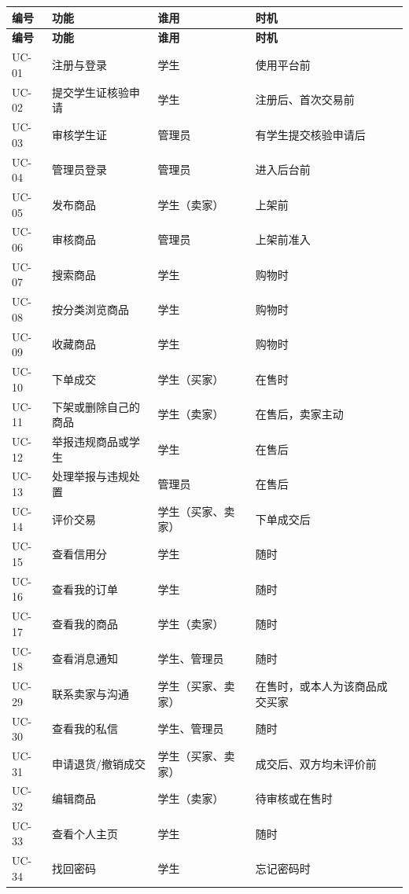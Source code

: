 \documentclass[12pt,a4paper]{ctexart}
\begin{document}
{\scriptsize
\begin{longtable}{|p{1.62cm}|p{4.40cm}|p{4.08cm}|p{5.89cm}|}
\hline
\textbf{编号} & \textbf{功能} & \textbf{谁用} & \textbf{时机} \\
\hline
\endfirsthead
\hline
\textbf{编号} & \textbf{功能} & \textbf{谁用} & \textbf{时机} \\
\hline
\endhead
\hline
\endfoot
UC-01 & 注册与登录 & 学生 & 使用平台前 \\
\hline
UC-02 & 提交学生证核验申请 & 学生 & 注册后、首次交易前 \\
\hline
UC-03 & 审核学生证 & 管理员 & 有学生提交核验申请后 \\
\hline
UC-04 & 管理员登录 & 管理员 & 进入后台前 \\
\hline
UC-05 & 发布商品 & 学生（卖家） & 上架前 \\
\hline
UC-06 & 审核商品 & 管理员 & 上架前准入 \\
\hline
UC-07 & 搜索商品 & 学生 & 购物时 \\
\hline
UC-08 & 按分类浏览商品 & 学生 & 购物时 \\
\hline
UC-09 & 收藏商品 & 学生 & 购物时 \\
\hline
UC-10 & 下单成交 & 学生（买家） & 在售时 \\
\hline
UC-11 & 下架或删除自己的商品 & 学生（卖家） & 在售后，卖家主动 \\
\hline
UC-12 & 举报违规商品或学生 & 学生 & 在售后 \\
\hline
UC-13 & 处理举报与违规处置 & 管理员 & 在售后 \\
\hline
UC-14 & 评价交易 & 学生（买家、卖家） & 下单成交后 \\
\hline
UC-15 & 查看信用分 & 学生 & 随时 \\
\hline
UC-16 & 查看我的订单 & 学生 & 随时 \\
\hline
UC-17 & 查看我的商品 & 学生（卖家） & 随时 \\
\hline
UC-18 & 查看消息通知 & 学生、管理员 & 随时 \\
\hline
UC-29 & 联系卖家与沟通 & 学生（买家、卖家） & 在售时，或本人为该商品成交买家 \\
\hline
UC-30 & 查看我的私信 & 学生、管理员 & 随时 \\
\hline
UC-31 & 申请退货/撤销成交 & 学生（买家、卖家） & 成交后、双方均未评价前 \\
\hline
UC-32 & 编辑商品 & 学生（卖家） & 待审核或在售时 \\
\hline
UC-33 & 查看个人主页 & 学生 & 随时 \\
\hline
UC-34 & 找回密码 & 学生 & 忘记密码时 \\
\hline
\end{longtable}
}
\end{document}
